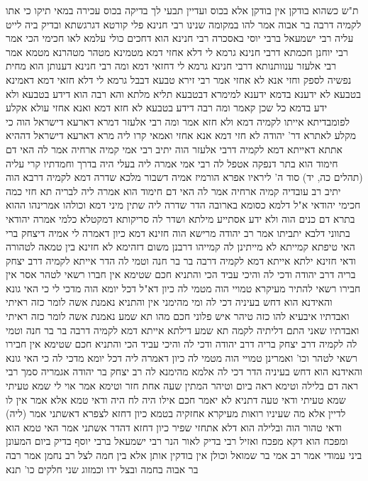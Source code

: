 \documentclass[12pt, openany]{book}
\begin{document}
{ת"ש כשהוא בודקן אין בודקן אלא בכוס ועדיין תבעי לך בדיקה בכוס עכירה במאי תיקו 
כי אתו לקמיה דרבה בר אבוה אמר להו במקומה שנינו רבי חנינא פלי קורטא דגרגשתא ובדיק ביה לייט עליה רבי ישמעאל ברבי יוסי באסכרה
רבי חנינא הוא דחכים כולי עלמא לאו חכימי הכי 
אמר רבי יוחנן חכמתא דרבי חנינא גרמא לי דלא אחזי דמא מטמינא מטהר מטהרנא מטמא אמר רבי אלעזר ענוותנותא דרבי חנינא גרמא לי דחזאי דמא ומה רבי חנינא דענותן הוא מחית נפשיה לספק וחזי אנא לא אחזי 
אמר רבי זירא טבעא דבבל גרמא לי דלא חזאי דמא דאמינא בטבעא לא ידענא בדמא ידענא 
למימרא דבטבעא תליא מלתא והא רבה הוא דידע בטבעא ולא ידע בדמא כל שכן קאמר ומה רבה דידע בטבעא לא חזא דמא ואנא אחזי 
עולא אקלע לפומבדיתא אייתו לקמיה דמא ולא חזא אמר ומה רבי אלעזר דמרא דארעא דישראל הוה כי מקלע לאתרא דר' יהודה לא חזי דמא אנא אחזי 
ואמאי קרו ליה מרא דארעא דישראל דההיא אתתא דאייתא דמא לקמיה דרבי אלעזר הוה יתיב רבי אמי קמיה ארחיה אמר לה האי דם חימוד הוא בתר דנפקה אטפל לה רבי אמי אמרה ליה בעלי היה בדרך וחמדתיו קרי עליה (תהלים כה, יד) סוד ה' ליראיו 
אפרא הורמיז אמיה דשבור מלכא שדרה דמא לקמיה דרבא הוה יתיב רב עובדיה קמיה ארחיה אמר לה האי דם חימוד הוא אמרה ליה לבריה תא חזי כמה חכימי יהודאי א"ל דלמא כסומא בארובה 
הדר שדרה ליה שתין מיני דמא וכולהו אמרינהו ההוא בתרא דם כנים הוה ולא ידע אסתייע מילתא ושדר לה סריקותא דמקטלא כלמי אמרה יהודאי בתווני דלבא יתביתו 
אמר רב יהודה מרישא הוה חזינא דמא כיון דאמרה לי אמיה דיצחק ברי האי טיפתא קמייתא לא מייתינן לה קמייהו דרבנן משום דזהימא לא חזינא
בין טמאה לטהורה ודאי חזינא 
ילתא אייתא דמא לקמיה דרבה בר בר חנה וטמי לה הדר אייתא לקמיה דרב יצחק בריה דרב יהודה ודכי לה 
והיכי עביד הכי והתניא חכם שטימא אין חברו רשאי לטהר אסר אין חבירו רשאי להתיר 
מעיקרא טמויי הוה מטמי לה כיון דא"ל דכל יומא הוה מדכי לי כי האי גונא והאידנא הוא דחש בעיניה דכי לה 
ומי מהימני אין והתניא נאמנת אשה לומר כזה ראיתי ואבדתיו 
איבעיא להו כזה טיהר איש פלוני חכם מהו 
תא שמע נאמנת אשה לומר כזה ראיתי ואבדתיו שאני התם דליתיה לקמה 
תא שמע דילתא אייתא דמא לקמיה דרבה בר בר חנה וטמי לה לקמיה דרב יצחק בריה דרב יהודה ודכי לה והיכי עביד הכי והתניא חכם שטימא אין חבירו רשאי לטהר וכו' 
ואמרינן טמויי הוה מטמי לה כיון דאמרה ליה דכל יומא מדכי לה כי האי גונא והאידנא הוא דחש בעיניה הדר דכי לה אלמא מהימנא לה 
רב יצחק בר יהודה אגמריה סמך 
רבי ראה דם בלילה וטימא ראה ביום וטיהר המתין שעה אחת חזר וטימא אמר אוי לי שמא טעיתי 
שמא טעיתי ודאי טעה דתניא לא יאמר חכם אילו היה לח היה ודאי טמא
אלא אמר אין לו לדיין אלא מה שעיניו רואות מעיקרא אחזקיה בטמא כיון דחזא לצפרא דאשתני אמר (ליה) ודאי טהור הוה ובלילה הוא דלא אתחזי שפיר כיון דחזא דהדר אשתני אמר האי טמא הוא ומפכח הוא דקא מפכח ואזיל 
רבי בדיק לאור הנר רבי ישמעאל ברבי יוסף בדיק ביום המעונן ביני עמודי אמר רב אמי בר שמואל וכולן אין בודקין אותן אלא בין חמה לצל רב נחמן אמר רבה בר אבוה בחמה ובצל ידו
וכמזוג שני חלקים כו' תנא}
\end{document}
